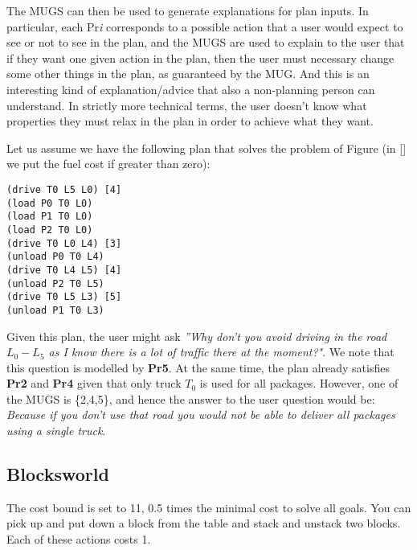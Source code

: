 The MUGS can then be used to generate explanations for plan inputs. In particular, each Pr\textit{i} corresponds to a possible action that a user would expect to see or not to see in the plan, and the MUGS are used to explain to the user that if they want one given action in the plan, then the user must necessary change some other things in the plan, as guaranteed by the MUG. And this is an interesting kind of explanation/advice that also a non-planning person can understand. In strictly more technical terms, the user doesn't know what properties they must relax in the plan in order to achieve what they want.

Let us assume we have the following plan that solves the problem of Figure  (in [] we put the fuel cost if greater than zero):

\begin{verbatim}
(drive T0 L5 L0) [4]
(load P0 T0 L0) 
(load P1 T0 L0) 
(load P2 T0 L0) 
(drive T0 L0 L4) [3]
(unload P0 T0 L4) 
(drive T0 L4 L5) [4]
(unload P2 T0 L5)
(drive T0 L5 L3) [5]
(unload P1 T0 L3)
\end{verbatim}

Given this plan, the user might ask \textit{''Why don't you avoid driving in the road $L_0-L_5$ as I know there is a lot of traffic there at the moment?"}. We note that this question is modelled by \textbf{Pr5}. At the same time, the plan already satisfies \textbf{Pr2} and \textbf{Pr4} given that only truck $T_0$ is used for all packages. However, one of the MUGS is \{2,4,5\}, and hence the answer to the user question would be: \textit{Because if you don't use that road you would not be able to deliver all packages using a single truck}.




\subsection{Blocksworld}

The cost bound is set to 11, 0.5 times the minimal cost to solve all goals.
You can pick up and put down a block from the table and stack and unstack two blocks.
Each of these actions costs 1.

